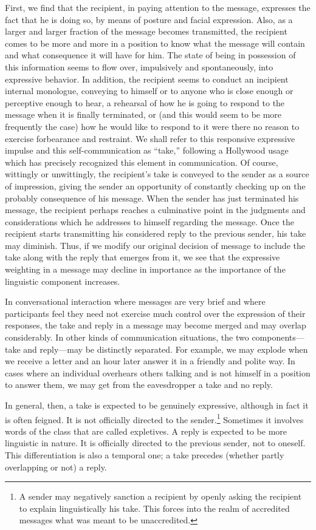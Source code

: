 \documentclass[openany,nobib]{tufte-book}
\begin{document}
First, we find that the recipient, in paying attention to the message,
expresses the fact that he is doing so, by means of posture and facial
expression. Also, as a larger and larger fraction of the message becomes
transmitted, the recipient comes to be more and more in a position to
know what the message will contain and what consequence it will have for
him. The state of being in possession of this information seems to flow
over, impulsively and spontaneously, into expressive behavior. In
addition, the recipient seems to conduct an incipient internal
monologue, conveying to himself or to anyone who is close enough or
perceptive enough to hear, a rehearsal of how he is going to respond to
the message when it is finally terminated, or (and this would seem to be
more frequently the case) how he would like to respond to it were there
no reason to exercise forbearance and restraint. We shall refer to this
responsive expressive impulse and this self-communication as ``take,''
following a Hollywood usage which has precisely recognized this element
in communication. Of course, wittingly or unwittingly, the recipient's
take is conveyed to the sender as a source of impression, giving the
sender an opportunity of constantly checking up on the probably
consequence of his message. When the sender has just terminated his
message, the recipient perhaps reaches a culminative point in the
judgments and considerations which he addresses to himself regarding the
message. Once the recipient starts transmitting his considered reply to
the previous sender, his take may diminish. Thus, if we modify our
original decision of message to include the take along with the reply
that emerges from it, we see that the expressive weighting in a message
may decline in importance as the importance of the linguistic component
increases.

In conversational interaction where messages are very brief and where
participants feel they need not exercise much control over the
expression of their responses, the take and reply in a message may
become merged and may overlap considerably. In other kinds of
communication situations, the two components---take and reply---may be
distinctly separated. For example, we may explode when we receive a
letter and an hour later answer it in a friendly and polite way. In
cases where an individual overhears others talking and is not himself in
a position to answer them, we may get from the eavesdropper a take and
no reply.

In general, then, a take is expected to be genuinely expressive,
although in fact it is often feigned. It is not officially directed to
the sender.\footnote{A sender may negatively sanction a recipient by
  openly asking the recipient to explain linguistically his take. This
  forces into the realm of accredited messages what was meant to be
  unaccredited.} Sometimes it involves words of the class that are
called expletives. A reply is expected to be more linguistic in nature.
It is officially directed to the previous sender, not to oneself. This
differentiation is also a temporal one; a take precedes (whether partly
overlapping or not) a reply.
\end{document}
